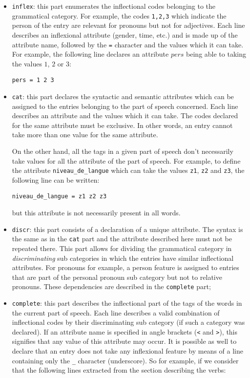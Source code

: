 \begin{itemize}
  \item \verb$inflex$: this part enumerates the inflectional
  codes belonging to the grammatical category. For example, the codes
  \verb$1,2,3$ which indicate the person of the entry are relevant for pronouns
  but not for adjectives. Each line describes an inflexional attribute (gender,
  time, etc.) and is made up of the attribute name, followed by the \verb$=$
  character and the values which it can take. For example, the following line
  declares an attribute $pers$ being able to taking the values $1$, $2$ or $3$:

\begin{verbatim}
pers = 1 2 3
\end{verbatim}

\item \verb$cat$: this part declares the syntactic and semantic
attributes which can be assigned to the entries belonging to the part of speech
concerned. Each line describes an attribute and the values which it can take. The
codes declared for the same attribute must be exclusive. In other words, an entry
cannot take more than one value for the same attribute.

On the other hand, all the tags in a given part of speech don't necessarily take
values for all the attribute of the part of speech. For example, to define the
attribute \verb$niveau_de_langue$ which can take the values \verb$z1$, \verb$z2$
and \verb$z3$, the following line can be written:


\begin{verbatim}
niveau_de_langue = z1 z2 z3
\end{verbatim}

but this attribute is not necessarily present in all words.

\item \verb$discr$: this part consists of a declaration of a
unique attribute. The syntax is the same as in the \verb$cat$ part and the
attribute described here must not be repeated there. This part allows for
dividing the grammatical category in \textit{discriminating} sub categories in
which the entries have similar inflectional attributes. For pronouns for example,
a person feature is assigned to entries that are part of the personal pronoun sub
category but not to relative pronouns. These dependencies are described in the
\verb$complete$ part;

\item \verb$complete$: this part describes the
inflectional part of the tags of the words in the current part of speech. Each
line describes a valid combination of inflectional codes by their discriminating
sub category (if such a category was declared). If an attribute name is specified
in angle brackets (\verb$<$ and \verb$>$), this signifies that any value of this
attribute may occur. It is possible as well to declare that an entry does not
take any inflexional feature by means of a line containing only the \verb$_$
character (underscore).\index{\verb$_$} So for example, if we consider that the
following lines extracted from the section describing the verbs:



\end{itemize}
